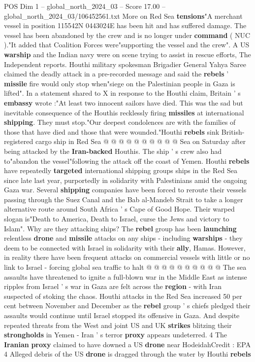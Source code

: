 \begin{textsample}{POS Dim 1 – global\_north\_2024\_03 – Score 17.00 – global\_north\_2024\_03/106452561.txt}  \label{ex:f1_pos_385}
More on Red Sea \textbf{tensions}"A merchant vessel in position 115542N 0443024E has been hit and has suffered damage.
The vessel has been abandoned by the crew and is no longer under \textbf{command} ( NUC )."It added that Coalition Forces were"supporting the vessel and the crew".
A US \textbf{warship} and the Indian navy were on scene trying to assist in rescue efforts, The Independent reports.
Houthi military spokesman Brigadier General Yahya Saree claimed the deadly attack in a pre-recorded message and said the \textbf{rebels} ' \textbf{missile} fire would only stop when"siege on the Palestinian people in Gaza is lifted".
In a statement shared to X in response to the Houthi claim, Britain ' s \textbf{embassy} wrote :"At least two innocent sailors have died.
This was the sad but inevitable consequence of the Houthis recklessly firing \textbf{missiles} at international \textbf{shipping}.
They must stop."Our deepest condolences are with the families of those that have died and those that were wounded."Houthi \textbf{rebels} sink British-registered cargo ship in Red Sea @ @ @ @ @ @ @ @ @ @ Sea on Saturday after being attacked by the \textbf{Iran-backed} Houthis.
The ship ' s crew also had to"abandon the vessel"following the attack off the coast of Yemen.
Houthi \textbf{rebels} have repeatedly \textbf{targeted} international shipping groups ships in the Red Sea since late last year, purportedly in solidarity with Palestinians amid the ongoing Gaza war.
Several \textbf{shipping} companies have been forced to reroute their vessels passing through the Suez Canal and the Bab al-Mandeb Strait to take a longer alternative route around South Africa ' s Cape of Good Hope.
Their warped slogan is"Death to America, Death to Israel, curse the Jews and victory to Islam".
Why are they attacking ships?
The \textbf{rebel} group has been \textbf{launching} relentless \textbf{drone} and \textbf{missile} attacks on any ships - including \textbf{warships} - they deem to be connected with Israel in solidarity with their \textbf{ally}, Hamas.
However, in reality there have been frequent attacks on commercial vessels with little or no link to Israel - forcing global sea traffic to halt @ @ @ @ @ @ @ @ @ @ The sea assaults have threatened to ignite a full-blown war in the Middle East as intense ripples from Israel ' s war in Gaza are felt across the \textbf{region} - with Iran suspected of stoking the chaos.
Houthi attacks in the Red Sea increased 50 per cent between November and December as the \textbf{rebel} group ' s chiefs pledged their assaults would continue until Israel stopped its offensive in Gaza.
And despite repeated threats from the West and joint US and UK \textbf{strikes} blitzing their \textbf{strongholds} in Yemen - Iran ' s terror \textbf{proxy} appears undeterred. 4 The \textbf{Iranian} \textbf{proxy} claimed to have downed a US \textbf{drone} near HodeidahCredit : EPA 4 Alleged debris of the US \textbf{drone} is dragged through the water by Houthi \textbf{rebels}

\end{textsample}
